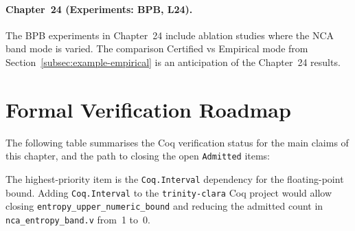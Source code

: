 \paragraph{Chapter~24 (Experiments: BPB, L24).}
The BPB experiments in Chapter~24 include ablation studies where the
NCA band mode is varied.  The comparison Certified vs Empirical mode
from Section~\ref{subsec:example-empirical} is an anticipation of
the Chapter~24 results.

\section{Formal Verification Roadmap}
\label{sec:e8-coq-roadmap}

The following table summarises the Coq verification status for the
main claims of this chapter, and the path to closing the open
\texttt{Admitted} items:

\begin{center}
\end{center}

The highest-priority item is the \texttt{Coq.Interval} dependency for
the floating-point bound.  Adding \texttt{Coq.Interval} to the
\texttt{trinity-clara} Coq project would allow closing
\texttt{entropy\_upper\_numeric\_bound} and reducing the admitted
count in \texttt{nca\_entropy\_band.v} from~1 to~0.

